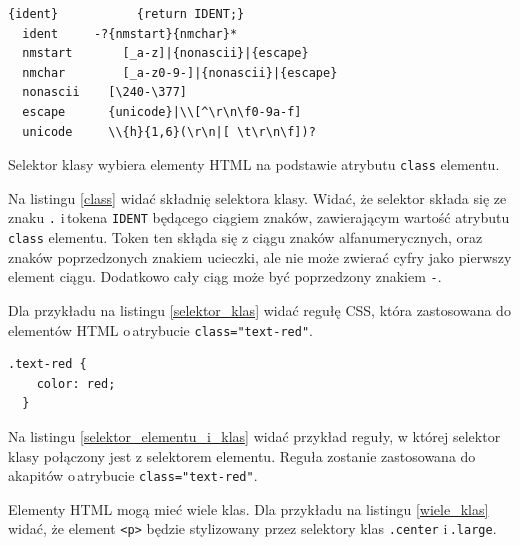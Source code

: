 \documentclass[a4paper,12pt]{book} %
\begin{document}
\begin{lstfloat}[hb]
  \lstset{language=HTML}
  \begin{lstlisting}[frame=single]
  {ident}			{return IDENT;}
  ident		-?{nmstart}{nmchar}*
  nmstart		[_a-z]|{nonascii}|{escape}
  nmchar		[_a-z0-9-]|{nonascii}|{escape}
  nonascii    [\240-\377]
  escape      {unicode}|\\[^\r\n\f0-9a-f]
  unicode     \\{h}{1,6}(\r\n|[ \t\r\n\f])?
\end{lstlisting}
  \caption{Składnia tokena \lstinline|IDENT| zwracanego przez lekser CSS \cite{GrammarofCSS}}\label{ident}
\end{lstfloat}

Selektor klasy wybiera elementy HTML na podstawie atrybutu \lstinline{class} elementu.

Na listingu \ref{class} widać składnię selektora klasy. Widać, że selektor składa się ze znaku \lstinline|.| i\,tokena \lstinline|IDENT| będącego ciągiem znaków, zawierającym wartość atrybutu \lstinline|class| elementu. Token ten skłąda się z ciągu znaków alfanumerycznych, oraz znaków poprzedzonych znakiem ucieczki, ale nie może zwierać cyfry jako pierwszy element ciągu. Dodatkowo cały ciąg może być poprzedzony znakiem \lstinline|-|.

Dla przykładu na listingu \ref{selektor_klas} widać regułę CSS, która zastosowana do elementów HTML o\,atrybucie \lstinline{class="text-red"}.



\begin{lstfloat}[hb]
  \lstset{language=HTML}
  \begin{lstlisting}[frame=single]
  .text-red {
    color: red;
  }\end{lstlisting}

  \caption{Reguła z selektorem elementów HTML o\,atrybucie \lstinline{class="text-red"}}
  \label{selektor_klas}

\end{lstfloat}




Na listingu \ref{selektor_elementu_i_klas} widać przykład reguły, w której selektor klasy połączony jest z selektorem elementu. Reguła zostanie zastosowana do akapitów o\,atrybucie \lstinline{class="text-red"}.




Elementy HTML mogą mieć wiele klas.
Dla przykładu na listingu \ref{wiele_klas} widać, że element \lstinline|<p>| będzie stylizowany przez selektory klas \lstinline|.center| i\,\lstinline|.large|.
\end{document}

